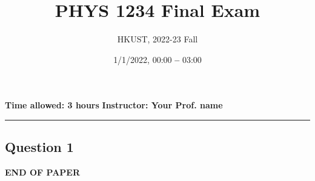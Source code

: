 \documentclass[a4paper, 12pt]{article}
\title{\textbf{PHYS 1234 Final Exam}}
\author{HKUST, 2022-23 Fall}
\date{1/1/2022, 00:00 \textbf{--} 03:00}
\begin{document}
	\maketitle
	
	\begin{center}
		\textbf{Time allowed: 3 hours}
		\hfill
		\textbf{Instructor: Your Prof. name} 
		\rule{16.5cm}{1pt}
	\end{center}
	
	\subsection*{Question 1}
	\lipsum[1]
	\vfill
	\centerline{\bf END OF PAPER}
\end{document}
